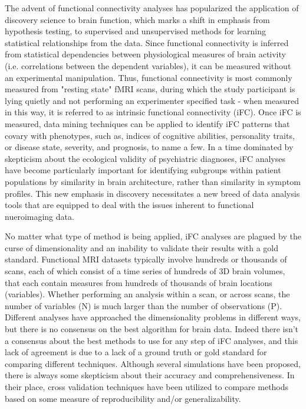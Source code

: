 The advent of functional connectivity analyses has popularized the application of discovery science to brain function, which marks a shift in emphasis from hypothesis testing, to supervised and unsupervised methods for learning statistical relationships from the data. Since functional connectivity is inferred from statistical dependencies between physiological measures of brain activity (i.e. correlations between the dependent variables), it can be measured without an experimental manipulation. Thus, functional connectivity is most commonly measured from "resting state" fMRI scans, during which the study participant is lying quietly and not performing an experimenter specified task - when measured in this way, it is referred to as intrinsic functional connectivity (iFC). Once iFC is measured, data mining techniques can be applied to identify iFC patterns that covary with phenotypes, such as, indices of cognitive abilities, personality traits, or disease state, severity, and prognosis, to name a few. In a time dominated by skepticism about the ecological validity of psychiatric diagnoses, iFC analyses have become particularly important for identifying subgroups within patient populations by similarity in brain architecture, rather than similarity in symptom profiles. This new emphasis in discovery necessitates a new breed of data analysis tools that are equipped to deal with the issues inherent to functional nueroimaging data.

No matter what type of method is being applied, iFC analyses are plagued by the curse of dimensionality and an inability to validate their results with a gold standard. Functional MRI datasets typically involve hundreds or thousands of scans, each of which consist of a time series of hundreds of 3D brain volumes, that each contain measures from hundreds of thousands of brain locations (variables). Whether performing an analysis within a scan, or across scans, the number of variables (N) is much larger than the number of observations (P). Different analyses have approached the dimensionality problems in different ways, but there is no consensus on the best algorithm for brain data. Indeed there isn't a consensus about the best methods to use for any step of iFC analyses, and this lack of agreement is due to a lack of a ground truth or gold standard for comparing different techniques. Although several simulations have been proposed, there is always some skepticism about their accuracy and comprehensiveness. In their place, cross validation techniques have been utilized to compare methods based on some measure of reproducibility and/or generalizability.

